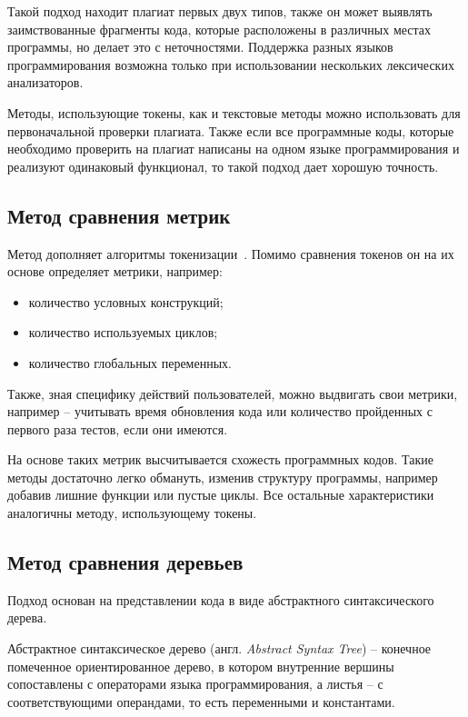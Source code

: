 Такой подход находит плагиат первых двух типов, также он может выявлять заимствованные фрагменты кода, которые расположены в различных местах программы, но делает это с неточностями. Поддержка разных языков программирования возможна только при использовании нескольких лексических анализаторов.

Методы, использующие токены, как и текстовые методы можно использовать для первоначальной проверки плагиата. Также если все программные коды, которые необходимо проверить на плагиат написаны на одном языке программирования и реализуют одинаковый функционал, то такой подход дает хорошую точность.

\subsection{Метод сравнения метрик}
Метод дополняет алгоритмы токенизации~\cite{metric}. Помимо сравнения токенов он на их основе определяет метрики, например:
\begin{itemize}[label*=---]
	\item количество условных конструкций;
	\item количество используемых циклов;
	\item количество глобальных переменных. 
\end{itemize}

Также, зная специфику действий пользователей, можно выдвигать свои метрики, например -- учитывать время обновления кода или  количество пройденных с первого раза тестов, если они имеются.

На основе таких метрик высчитывается схожесть программных кодов. Такие методы достаточно легко обмануть, изменив структуру программы, например добавив лишние функции или пустые циклы. Все остальные характеристики аналогичны методу, использующему токены. 

\subsection{Метод сравнения деревьев}
Подход  основан на представлении кода в виде абстрактного синтаксического дерева. 

Абстрактное синтаксическое дерево (англ. \textit{Abstract Syntax Tree}) --  конечное помеченное ориентированное дерево, в котором внутренние вершины сопоставлены с операторами языка программирования, а листья -- с соответствующими операндами, то есть переменными и константами.

